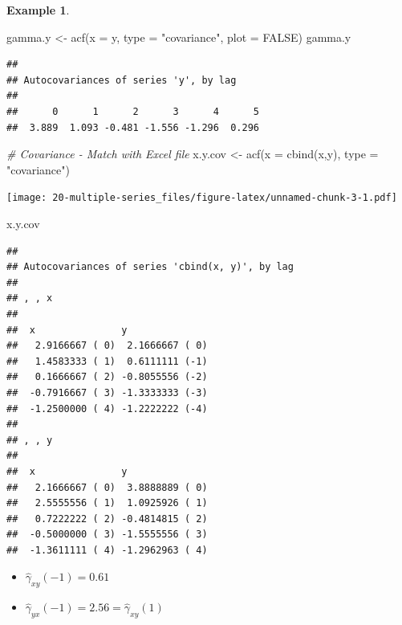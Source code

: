 \documentclass[
]{book}
\newenvironment{Shaded}{\begin{snugshade}}{\end{snugshade}}
\newcommand{\AttributeTok}[1]{\textcolor[rgb]{0.77,0.63,0.00}{#1}}
\newcommand{\CommentTok}[1]{\textcolor[rgb]{0.56,0.35,0.01}{\textit{#1}}}
\newcommand{\ConstantTok}[1]{\textcolor[rgb]{0.00,0.00,0.00}{#1}}
\newcommand{\FunctionTok}[1]{\textcolor[rgb]{0.00,0.00,0.00}{#1}}
\newcommand{\NormalTok}[1]{#1}
\newcommand{\OtherTok}[1]{\textcolor[rgb]{0.56,0.35,0.01}{#1}}
\newcommand{\StringTok}[1]{\textcolor[rgb]{0.31,0.60,0.02}{#1}}
\theoremstyle{definition}
\theoremstyle{definition}
\newtheorem{example}{Example}[chapter]
\theoremstyle{definition}
\theoremstyle{definition}
\theoremstyle{remark}
\begin{document}
\begin{example}
\begin{Shaded}
\begin{Highlighting}[]
\NormalTok{gamma.y }\OtherTok{\textless{}{-}} \FunctionTok{acf}\NormalTok{(}\AttributeTok{x =}\NormalTok{ y, }\AttributeTok{type =} \StringTok{"covariance"}\NormalTok{, }\AttributeTok{plot =} \ConstantTok{FALSE}\NormalTok{)}
\NormalTok{gamma.y}
\end{Highlighting}
\end{Shaded}

\begin{verbatim}
## 
## Autocovariances of series 'y', by lag
## 
##      0      1      2      3      4      5 
##  3.889  1.093 -0.481 -1.556 -1.296  0.296
\end{verbatim}

\begin{Shaded}
\begin{Highlighting}[]
\CommentTok{\# Covariance {-} Match with Excel file}
\NormalTok{x.y.cov }\OtherTok{\textless{}{-}} \FunctionTok{acf}\NormalTok{(}\AttributeTok{x =} \FunctionTok{cbind}\NormalTok{(x,y), }\AttributeTok{type =} \StringTok{"covariance"}\NormalTok{)}
\end{Highlighting}
\end{Shaded}

\texttt{[image: 20-multiple-series\_files/figure-latex/unnamed-chunk-3-1.pdf]}

\begin{Shaded}
\begin{Highlighting}[]
\NormalTok{x.y.cov}
\end{Highlighting}
\end{Shaded}

\begin{verbatim}
## 
## Autocovariances of series 'cbind(x, y)', by lag
## 
## , , x
## 
##  x               y              
##   2.9166667 ( 0)  2.1666667 ( 0)
##   1.4583333 ( 1)  0.6111111 (-1)
##   0.1666667 ( 2) -0.8055556 (-2)
##  -0.7916667 ( 3) -1.3333333 (-3)
##  -1.2500000 ( 4) -1.2222222 (-4)
## 
## , , y
## 
##  x               y              
##   2.1666667 ( 0)  3.8888889 ( 0)
##   2.5555556 ( 1)  1.0925926 ( 1)
##   0.7222222 ( 2) -0.4814815 ( 2)
##  -0.5000000 ( 3) -1.5555556 ( 3)
##  -1.3611111 ( 4) -1.2962963 ( 4)
\end{verbatim}

\begin{itemize}
\item
  \(\hat \gamma_{xy}(-1)=0.61\)
\item
  \(\hat \gamma_{yx}(-1)=2.56=\hat \gamma_{xy}(1)\)
\end{itemize}


\end{example}
\end{document}
